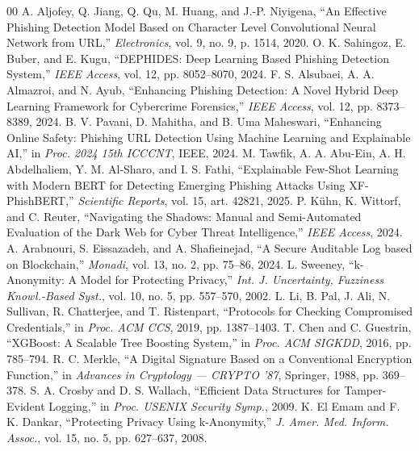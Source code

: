 \documentclass[conference]{IEEEtran}
\begin{document}
\begin{thebibliography}{00}
 A. Aljofey, Q. Jiang, Q. Qu, M. Huang, and J.-P. Niyigena, ``An Effective Phishing Detection Model Based on Character Level Convolutional Neural Network from URL,'' \textit{Electronics}, vol. 9, no. 9, p. 1514, 2020.
 O. K. Sahingoz, E. Buber, and E. Kugu, ``DEPHIDES: Deep Learning Based Phishing Detection System,'' \textit{IEEE Access}, vol. 12, pp. 8052--8070, 2024.
 F. S. Alsubaei, A. A. Almazroi, and N. Ayub, ``Enhancing Phishing Detection: A Novel Hybrid Deep Learning Framework for Cybercrime Forensics,'' \textit{IEEE Access}, vol. 12, pp. 8373--8389, 2024.
 B. V. Pavani, D. Mahitha, and B. Uma Maheswari, ``Enhancing Online Safety: Phishing URL Detection Using Machine Learning and Explainable AI,'' in \textit{Proc. 2024 15th ICCCNT}, IEEE, 2024.
 M. Tawfik, A. A. Abu-Ein, A. H. Abdelhaliem, Y. M. Al-Sharo, and I. S. Fathi, ``Explainable Few-Shot Learning with Modern BERT for Detecting Emerging Phishing Attacks Using XF-PhishBERT,'' \textit{Scientific Reports}, vol. 15, art. 42821, 2025.
 P. K{\"u}hn, K. Wittorf, and C. Reuter, ``Navigating the Shadows: Manual and Semi-Automated Evaluation of the Dark Web for Cyber Threat Intelligence,'' \textit{IEEE Access}, 2024.
 A. Arabnouri, S. Eissazadeh, and A. Shafieinejad, ``A Secure Auditable Log based on Blockchain,'' \textit{Monadi}, vol. 13, no. 2, pp. 75--86, 2024.
 L. Sweeney, ``k-Anonymity: A Model for Protecting Privacy,'' \textit{Int. J. Uncertainty, Fuzziness Knowl.-Based Syst.}, vol. 10, no. 5, pp. 557--570, 2002.
 L. Li, B. Pal, J. Ali, N. Sullivan, R. Chatterjee, and T. Ristenpart, ``Protocols for Checking Compromised Credentials,'' in \textit{Proc. ACM CCS}, 2019, pp. 1387--1403.
 T. Chen and C. Guestrin, ``XGBoost: A Scalable Tree Boosting System,'' in \textit{Proc. ACM SIGKDD}, 2016, pp. 785--794.
 R. C. Merkle, ``A Digital Signature Based on a Conventional Encryption Function,'' in \textit{Advances in Cryptology --- CRYPTO '87}, Springer, 1988, pp. 369--378.
 S. A. Crosby and D. S. Wallach, ``Efficient Data Structures for Tamper-Evident Logging,'' in \textit{Proc. USENIX Security Symp.}, 2009.
 K. El Emam and F. K. Dankar, ``Protecting Privacy Using k-Anonymity,'' \textit{J. Amer. Med. Inform. Assoc.}, vol. 15, no. 5, pp. 627--637, 2008.

\end{thebibliography}
\end{document}
